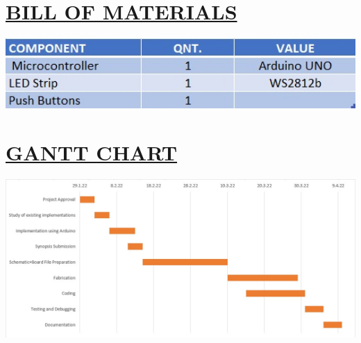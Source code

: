 \documentclass[12pt]{article}
\begin{document}
\pagebreak
\section*{\underline{BILL OF MATERIALS}}
\includegraphics[width=15cm]{bill.jpg}


\section*{\underline{GANTT CHART}}
\includegraphics[width=18cm]{gantt.jpeg}
\end{document}
